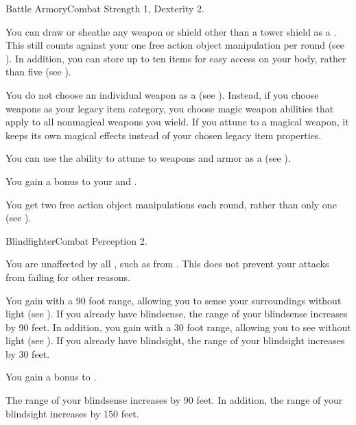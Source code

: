   \begin{feat}{Battle Armory}{Combat}
    \featpre Strength 1, Dexterity 2.

     You can draw or sheathe any weapon or shield other than a tower shield as a .
    This still counts against your one free action object manipulation per round (see ).
    In addition, you can store up to ten items for easy access on your body, rather than five (see ).

     You do not choose an individual weapon as a  (see ).
    Instead, if you choose weapons as your legacy item category, you choose magic weapon abilities that apply to all nonmagical weapons you wield.
    If you attune to a magical weapon, it keeps its own magical effects instead of your chosen legacy item properties.

     You can use the  ability to attune to weapons and armor as a  (see ).

     You gain a  bonus to your  and .

     You get two free action object manipulations each round, rather than only one (see ).
  \end{feat}

  \begin{feat}{Blindfighter}{Combat}
    \featpre Perception 2.

     You are unaffected by all , such as from .
    This does not prevent your attacks from failing for other reasons.

     You gain  with a 90 foot range, allowing you to sense your surroundings without light (see ).
    If you already have blindsense, the range of your blindsense increases by 90 feet.
    In addition, you gain  with a 30 foot range, allowing you to see without light (see ).
    If you already have blindsight, the range of your blindsight increases by 30 feet.

     You gain a  bonus to .

     The range of your blindsense increases by 90 feet.
    In addition, the range of your blindsight increases by 150 feet.
  \end{feat}

